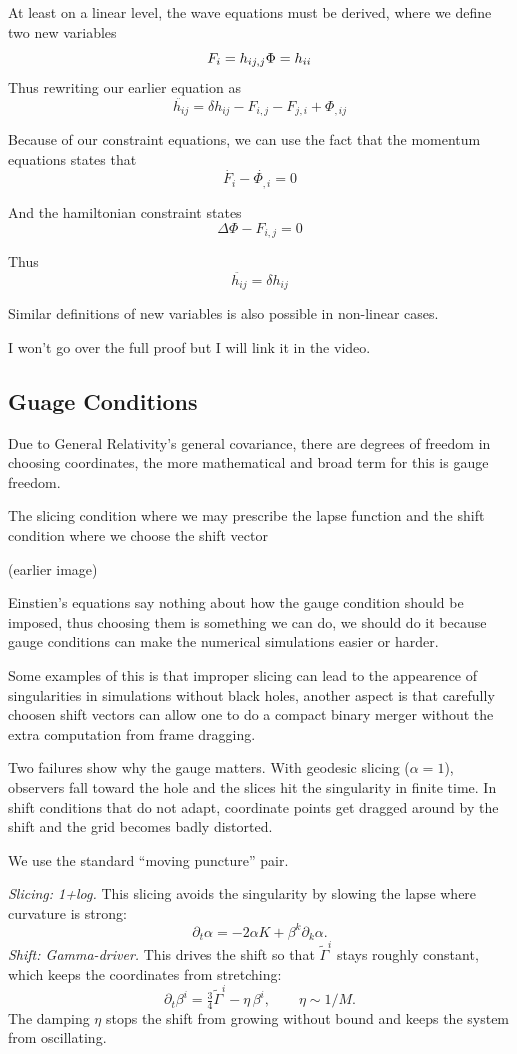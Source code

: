 At least on a linear level, the wave equations must be derived, where we define two new variables
\[
	F_i = h_{ij,j}
	\\
	\Phi = h_{ii}
\]
Thus rewriting our earlier equation as
\[
	\ddot{h_{ij}} = \delta h_{ij} - F_{i,j} - F_{j,i} + \Phi_{,ij}
\]

Because of our constraint equations, we can use the fact that the momentum equations states that
\[
	\dot{F_i} - \dot{\Phi_{,i}} = 0
\]

And the hamiltonian constraint states
\[
	\Delta \Phi - F_{i,j} = 0
\]

Thus
\[
	\ddot{h_{ij}} = \delta h_{ij}
\]

Similar definitions of new variables is also possible in non-linear cases.

I won't go over the full proof but I will link it in the video.

\subsection{Guage Conditions}

Due to General Relativity's general covariance, there are degrees of freedom in choosing coordinates, the more mathematical and broad term for this is gauge freedom.

The slicing condition where we may prescribe the lapse function and the shift condition where we choose the shift vector

(earlier image)

Einstien's equations say nothing about how the gauge condition should be imposed, thus choosing them is something we can do, we should do it because gauge conditions can make the numerical simulations easier or harder.

Some examples of this is that improper slicing can lead to the appearence of singularities in simulations without black holes, another aspect is that carefully choosen shift vectors can allow one to do a compact binary merger without the extra computation from frame dragging.

Two failures show why the gauge matters. With geodesic slicing ($\alpha=1$), observers
fall toward the hole and the slices hit the singularity in finite time. In shift
conditions that do not adapt, coordinate points get dragged around by the shift and
the grid becomes badly distorted.

We use the standard ``moving puncture'' pair.

\emph{Slicing: 1+log.} This slicing avoids the singularity by slowing the lapse where
curvature is strong:
\[
	\partial_t\alpha=-2\alpha K+\beta^k\partial_k\alpha.
\]
\emph{Shift: Gamma-driver.} This drives the shift so that $\tilde\Gamma^i$ stays roughly
constant, which keeps the coordinates from stretching:
\[
	\partial_t\beta^i=\tfrac34\tilde\Gamma^i-\eta\,\beta^i,\qquad \eta\sim 1/M.
\]
The damping $\eta$ stops the shift from growing without bound and keeps the system
from oscillating.

